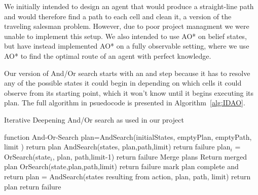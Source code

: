 \documentclass{article}
\begin{document}
We initially intended to design an agent that would produce a straight-line path and would therefore find a path to each cell and clean it, a version of the traveling salesman problem. However, due to poor project managment we were unable to implement this setup. We also intended to use AO* on belief states, but have instead implemented AO* on a fully observable setting, where we use AO* to find the optimal route of an agent with perfect knowledge.

Our version of And/Or search starts with an and step because it has to resolve any of the possible states it could begin in depending on which cells it could observe from its starting point, which it won't know until it begins executing its plan. The full algorithm in psuedocode is presented in Algorithm~\ref{alg:IDAO}. 
\pagebreak
\begin{algorithm}[h]
  \caption{Iterative Deepening And/Or search as used in our project}
  \begin{algorithmic}[1]
    \State function And-Or-Search
      \State plan=AndSearch(initialStates, emptyPlan, emptyPath, limit )
        \State return plan
      \EndIf
    \EndFor
    \State
    \State AndSearch(states, plan,path,limit)
      \State return failure
    \EndIf
     \State plan$_i$ = OrSearch(state$_i$, plan, path,limit-1)
        \State return failure
      \EndIf
      \State Merge plans
    \EndFor
    \State Return merged plan
    \State
    \State OrSearch(state,plan,path,limit)
      \State return failure
    \EndIf
      \State mark plan complete and return
    \EndIf
      \State plan = AndSearch(states resulting from action, plan, path, limit)
        \State return plan
      \EndIf
    \EndFor
    \State return failure
  \end{algorithmic}
  \label{alg:IDAO}
\end{algorithm}






\pagebreak
\pagebreak
\end{document}
